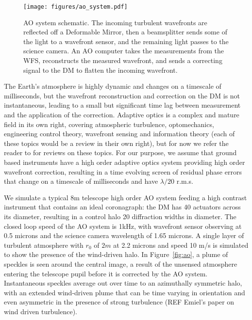 \documentclass[letterpaper]{ar-1col}
\begin{document}
\begin{figure}[!ht]
\centering
\texttt{[image: figures/ao\_system.pdf]}
 \caption{AO system schematic. The incoming turbulent wavefronts are reflected off a Deformable Mirror, then a beamsplitter sends some of the light to a wavefront sensor, and the remaining light passes to the science camera. An AO computer takes the measurements from the WFS, reconstructs the measured wavefront, and sends a correcting signal to the DM to flatten the incoming wavefront.}
  \label{fig:aosystem}
\end{figure}

The Earth's atmosphere is highly dynamic and changes on a timescale of milliseconds, but the wavefront reconstruction and correction on the DM is not instantaneous, leading to a small but significant time lag between measurement and the application of the correction.
%
Adaptive optics is a complex and mature field in its own right, covering atmospheric turbulence, optomechanics, engineering control theory, wavefront sensing and information theory (each of these topics would be a review in their own right), but for now we refer the reader to \citet{Guyon18} for reviews on these topics. 
%
For our purpose, we assume that ground based instruments have a high order adaptive optics system providing high order wavefront correction, resulting in a time evolving screen of residual phase errors that change on a timescale of milliseconds and have $\lambda/20$ r.m.s.

We simulate a typical 8m telescope high order AO system feeding a high contrast instrument that contains an ideal coronagraph: the DM has 40 actuators across its diameter, resulting in a control halo 20 diffraction widths in diameter. 
%
The closed loop speed of the AO system is 1kHz, with wavefront sensor observing at 0.5 microns and the science camera wavelength of 1.65 microns.
%
A single layer of turbulent atmosphere with $r_0$ of $2m$ at 2.2 microns and speed 10 m/s is simulated to show the presence of the wind-driven halo.
%
In Figure~\ref{fig:ao}, a plume of speckles is seen around the central image, a result of the unsensed atmosphere entering the telescope pupil before it is corrected by the AO system. 
%
Instantaneous speckles average out over time to an azimuthally symmetric halo, with an extended wind-driven plume that can be time varying in orientation and even asymmetric in the presence of strong turbulence (REF Emiel's paper on wind driven turbulence).

\end{document}
